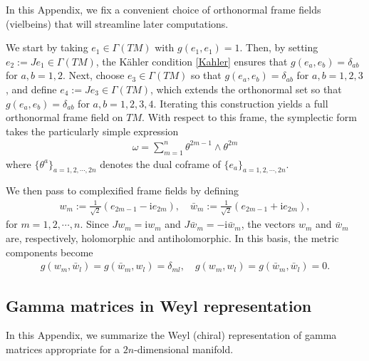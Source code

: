 \documentclass[12pt]{article}
\newcommand{\im}{\mathrm{i}}
\theoremstyle{definition} %
\theoremstyle{plain} %
\theoremstyle{remark} %
\theoremstyle{underline}
\begin{document}
In this Appendix, we fix a convenient choice of orthonormal frame fields
(vielbeins) that will streamline later computations.

We start by taking $e_1\in \Gamma(TM)$ with $g(e_1,e_1)=1$.
Then, by setting $e_2:=Je_1\in \Gamma(TM)$, the K{\"a}hler condition
\eqref{Kahler} ensures that $g(e_a,e_b)=\delta_{ab}$ for $a,b=1,2$.
Next, choose $e_3\in \Gamma(TM)$ so that $g(e_a,e_b)=\delta_{ab}$ for
$a,b=1,2,3$, and define $e_4:=Je_3\in \Gamma(TM)$, which extends the orthonormal
set so that $g(e_a,e_b)=\delta_{ab}$ for $a,b=1,2,3,4$.
Iterating this construction yields a full orthonormal frame field on $TM$.
With respect to this frame, the symplectic form takes the particularly simple
expression
\begin{align}
\label{symplectic 1}
\omega = \sum_{m=1}^n \theta^{2m-1} \wedge \theta^{2m}
\end{align}
where $\{\theta^a\}_{a=1,2,\cdots,2n}$ denotes the dual coframe of
$\{e_a\}_{a=1,2,\cdots,2n}$.

We then pass to complexified frame fields by defining
\begin{align}
    \label{complex vielbein}
    w_m := \frac{1}{\sqrt 2} (e_{2m-1} - \im  e_{2m}), \quad \bar{w}_{m} := \frac{1}{\sqrt 2} (e_{2m-1} + \im  e_{2m}),
\end{align}
for $m=1,2,\cdots,n$.
Since $J w_m=\im w_m$ and $J\bar{w}_m=-\im\bar{w}_m$, the vectors $w_m$ and
$\bar{w}_m$ are, respectively, holomorphic and antiholomorphic.
In this basis, the metric components become
\begin{align}
     g(w_m,\bar{w}_{l})  = g(\bar{w}_{m}, w_l) = \delta_{ml}, \quad g(w_m,w_l) =  g(\bar{w}_{m},\bar{w}_{l})=0.
\end{align}






\subsection{Gamma matrices in Weyl representation}
\label{Clifford}


In this Appendix, we summarize the Weyl (chiral) representation of gamma
matrices appropriate for a $2n$-dimensional manifold.
\end{document}
